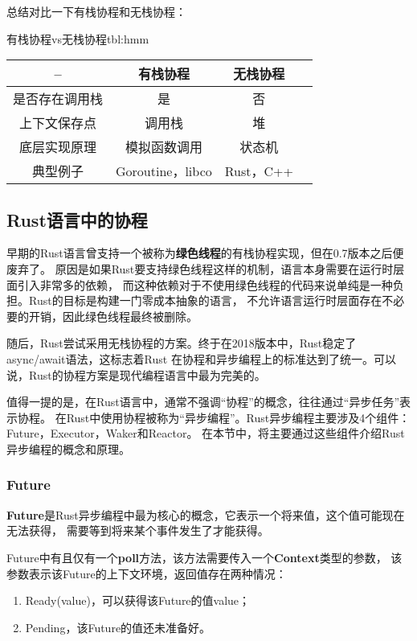 \documentclass[supercite]{HustGraduPaper}
\theoremstyle{definition}
\begin{document}
总结对比一下有栈协程和无栈协程：

\begin{generaltab}{有栈协程vs无栈协程}{tbl:hmm}
  \begin{tabular}{c|ccc}
    \toprule
    -- & 有栈协程 & 无栈协程 \\
    \midrule
    是否存在调用栈 & 是 & 否 \\
    上下文保存点 & 调用栈 & 堆 \\
    底层实现原理 & 模拟函数调用 & 状态机 \\
    典型例子 & Goroutine，libco & Rust，C++ \\
    \bottomrule
  \end{tabular}
\end{generaltab}

\subsection{Rust语言中的协程}
早期的Rust语言曾支持一个被称为\textbf{绿色线程}的有栈协程实现，但在0.7版本之后便废弃了。
原因是如果Rust要支持绿色线程这样的机制，语言本身需要在运行时层面引入非常多的依赖，
而这种依赖对于不使用绿色线程的代码来说单纯是一种负担。Rust的目标是构建一门零成本抽象的语言，
不允许语言运行时层面存在不必要的开销，因此绿色线程最终被删除。\par

随后，Rust尝试采用无栈协程的方案。终于在2018版本中，Rust稳定了async/await语法，这标志着Rust
在协程和异步编程上的标准达到了统一。可以说，Rust的协程方案是现代编程语言中最为完美的。\par

值得一提的是，在Rust语言中，通常不强调“协程”的概念，往往通过“异步任务”表示协程。
在Rust中使用协程被称为“异步编程”。Rust异步编程主要涉及4个组件：Future，Executor，Waker和Reactor。
在本节中，将主要通过这些组件介绍Rust异步编程的概念和原理。\par

\subsubsection{Future}
\textbf{Future}是Rust异步编程中最为核心的概念，它表示一个将来值，这个值可能现在无法获得，
需要等到将来某个事件发生了才能获得。\par

Future中有且仅有一个\textbf{poll}方法，该方法需要传入一个\textbf{Context}类型的参数，
该参数表示该Future的上下文环境，返回值存在两种情况：

\begin{enumerate}
  \item Ready(value)，可以获得该Future的值value；
  \item Pending，该Future的值还未准备好。
\end{enumerate}
\end{document}
